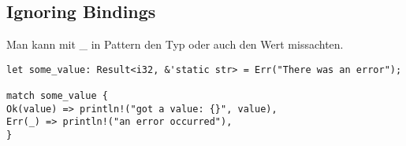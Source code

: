 \subsection{Ignoring Bindings}
Man kann mit \_ in Pattern den Typ oder auch den Wert missachten.

\begin{lstlisting}
let some_value: Result<i32, &'static str> = Err("There was an error");

match some_value {
Ok(value) => println!("got a value: {}", value),
Err(_) => println!("an error occurred"),
}
\end{lstlisting}